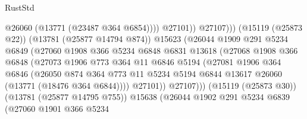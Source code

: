 \begin{lexlean}{RustStd}
\begin{coremodule}
                                            @26060
                                            (@13771 (@23487 @364 @6854))))
                                        @27101))
                                    @27107)))
                              (@15119 (@25873 @22))
                              (@13781 (@25877 @14794 @874))
                              @15623
                              (@26044
                                @1909
                                @291
                                @5234
                                @6849
                                (@27060
                                  @1908
                                  @366
                                  @5234
                                  @6848
                                  @6831
                                  @13618
                                  (@27068
                                    @1908
                                    @366
                                    @6848
                                    (@27073
                                      @1906
                                      @773
                                      @364
                                      @11
                                      @6846
                                      @5194
                                      (@27081
                                        @1906
                                        @364
                                        @6846
                                        (@26050
                                          @874
                                          @364
                                          @773
                                          @11
                                          @5234
                                          @5194
                                          @6844
                                          @13617
                                          @26060
                                          (@13771 (@18476 @364 @6844))))
                                      @27101))
                                  @27107)))
                            (@15119 (@25873 @30))
                            (@13781 (@25877 @14795 @755))
                            @15638
                            (@26044
                              @1902
                              @291
                              @5234
                              @6839
                              (@27060
                                @1901
                                @366
                                @5234

\end{coremodule}
\end{lexlean}

